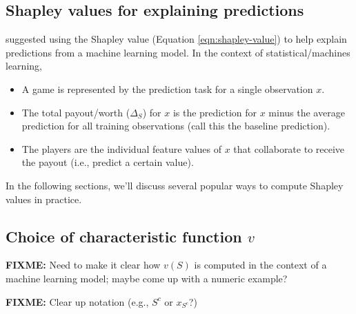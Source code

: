 \subsection{Shapley values for explaining predictions}

\citet{strumbelj-2014-explaining} suggested using the Shapley value
(Equation \eqref{eqn:shapley-value}) to help explain predictions from a
machine learning model. In the context of statistical/machines learning,

\begin{itemize}

  \item A game is represented by the prediction task for a single observation $x$.
  
  \item The total payout/worth ($\Delta_S$) for $x$ is the prediction for $x$ minus the average prediction for all training observations (call this the baseline prediction).
  
  \item The players are the individual feature values of $x$ that collaborate to receive the payout (i.e., predict a certain value).
  
\end{itemize}

In the following sections, we'll discuss several popular ways to compute
Shapley values in practice.

\subsection{Choice of characteristic function $v$}

\textbf{FIXME:} Need to make it clear how \(v\left(S\right)\) is
computed in the context of a machine learning model; maybe come up with
a numeric example?

\textbf{FIXME:} Clear up notation (e.g., \(S^c\) or \(x_{S^c}\)?)

